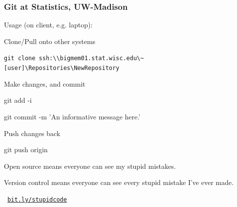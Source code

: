 \documentclass[12pt,t]{beamer}
\begin{document}
\begin{frame}
\frametitle{Git at Statistics, UW-Madison}

\vspace{18pt}

Usage (on client, e.g. laptop):
\bigskip

\bi
\item Clone/Pull onto other systems
    \bi
    \item[] {\tt \tiny git clone ssh:{\textbackslash\textbackslash}bigmem01.stat.wisc.edu{\textbackslash\textasciitilde}[user]{\textbackslash}Repositories{\textbackslash}NewRepository}
    \ei
\item Make changes, and commit
    \bi
    \item[] {\ttfn git add -i}
    \item[] {\ttfn git commit -m 'An informative message here.'}
    \ei
\item Push changes back
    \bi
    \item[] {\ttfn git push origin}
    \ei
\ei

\end{frame}






\begin{frame}{}

\vspace{25mm}

Open source means everyone can see my stupid mistakes.

\vspace{5mm}

Version control means everyone can see every stupid mistake I've ever
made.

\vspace{33mm}
\centerline{\scriptsize \tt \color{lolit} \href{http://bit.ly/stupidcode}{bit.ly/stupidcode}}

\end{frame}
\end{document}
